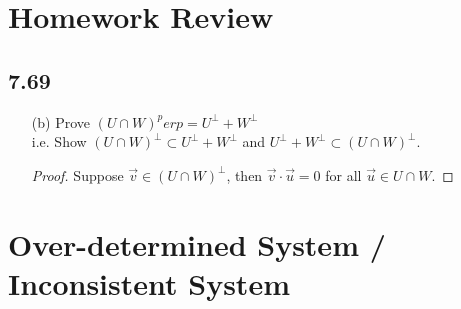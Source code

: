 \documentclass{report}
\theoremstyle{plain}
\theoremstyle{definition}
\theoremstyle{plain}
\begin{document}
\section{Homework Review}
\subsection{7.69}
\begin{enumerate}
\item[(b)]Prove $(U\cap W)^perp = U^\perp + W^\perp$\\
	i.e. Show $(U\cap W)^\perp\subset U^\perp + W^\perp$ and $U^\perp + W^\perp \subset (U\cap W)^\perp$.
	\begin{proof}
	Suppose $\vec{v}\in(U\cap W)^\perp$, then $\vec{v}\cdot\vec{u}=0$ for all $\vec{u}\in U\cap W$.
	\end{proof}
\end{enumerate}

\section{Over-determined System / Inconsistent System}
\end{document}
